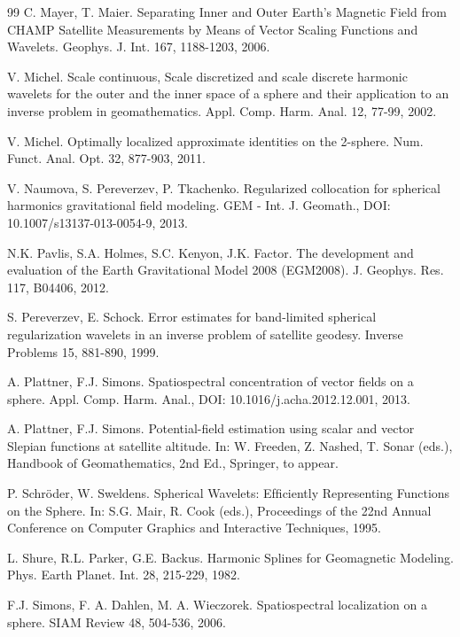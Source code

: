 \documentclass[a4paper, 10pt]{article}
\numberwithin{equation}{section}
\theoremstyle{definition}
\begin{document}
\begin{thebibliography}{99}
C. Mayer, T. Maier. Separating Inner and Outer Earth's Magnetic Field from CHAMP Satellite Measurements by Means of Vector Scaling Functions and Wavelets. Geophys. J. Int. 167, 1188-1203, 2006.

V. Michel. Scale continuous, Scale discretized and scale discrete harmonic wavelets for the outer and the inner space of a sphere and their application to an inverse problem in geomathematics. Appl. Comp. Harm. Anal. 12, 77-99, 2002.

V. Michel. Optimally localized approximate identities on the 2-sphere. Num. Funct. Anal. Opt. 32, 877-903, 2011.

V. Naumova, S. Pereverzev, P. Tkachenko. Regularized collocation for spherical harmonics gravitational field modeling. GEM - Int. J. Geomath., DOI: 10.1007/s13137-013-0054-9, 2013.

N.K. Pavlis, S.A. Holmes, S.C. Kenyon, J.K. Factor. The development and evaluation of the Earth Gravitational Model 2008 (EGM2008). J. Geophys. Res. 117, B04406, 2012.

S. Pereverzev, E. Schock. Error estimates for band-limited spherical regularization wavelets in an inverse problem of satellite geodesy. Inverse Problems 15, 881-890, 1999.

A. Plattner, F.J. Simons. Spatiospectral concentration of vector fields on a sphere. Appl. Comp. Harm. Anal., DOI: 10.1016/j.acha.2012.12.001, 2013.

A. Plattner, F.J. Simons. Potential-field estimation using scalar and vector Slepian functions at satellite altitude. In: W. Freeden, Z. Nashed, T. Sonar (eds.), Handbook of Geomathematics, 2nd Ed., Springer, to appear.


P. Schr\"oder, W. Sweldens. Spherical Wavelets: Efﬁciently Representing Functions on the Sphere. In: S.G. Mair, R. Cook (eds.), Proceedings of the 22nd Annual Conference on Computer Graphics and Interactive Techniques, 1995.

L. Shure, R.L. Parker, G.E. Backus. Harmonic Splines for Geomagnetic Modeling. Phys. Earth Planet. Int. {28}, 215-229, 1982.

F.J. Simons, F. A. Dahlen, M. A. Wieczorek. Spatiospectral localization on a sphere. SIAM Review 48, 504-536, 2006.


\end{thebibliography}
\end{document}
